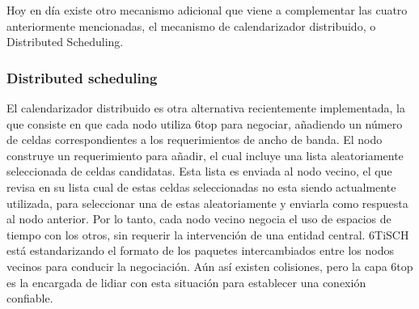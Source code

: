 Hoy en día existe otro mecanismo adicional que viene a complementar las cuatro anteriormente mencionadas, el mecanismo de calendarizador distribuido, o Distributed Scheduling.

\subsubsection{Distributed scheduling}

El calendarizador distribuido es otra alternativa recientemente implementada, la que consiste en que cada nodo utiliza 6top para negociar, añadiendo un número de celdas correspondientes a los requerimientos de ancho de banda. El nodo construye un requerimiento para añadir, el cual incluye una lista aleatoriamente seleccionada de celdas candidatas. Esta lista es enviada al nodo vecino, el que revisa en su lista cual de estas celdas seleccionadas no esta siendo actualmente utilizada, para seleccionar una de estas aleatoriamente y enviarla como respuesta al nodo anterior. Por lo tanto, cada nodo vecino negocia el uso de espacios de tiempo con los otros, sin requerir la intervención de una entidad central. 6TiSCH está estandarizando el formato de los paquetes intercambiados entre los nodos vecinos para conducir la negociación. Aún así existen colisiones, pero la capa 6top es la encargada de lidiar con esta situación para establecer una conexión confiable.
\cite{muraoka2016simple}

